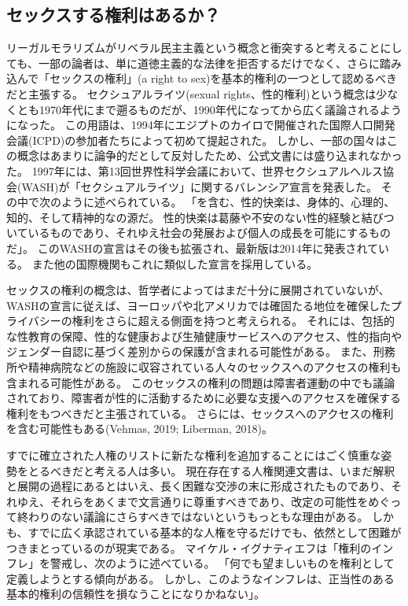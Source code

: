 \documentclass[paper=a4,book,openany]{jlreq} \usepackage{mystyle}
\begin{document}
\subsection{セックスする権利はあるか？}

リーガルモラリズムがリベラル民主主義という概念と衝突すると考えることにしても、一部の論者は、単に道徳主義的な法律を拒否するだけでなく、さらに踏み込んで「セックスの権利」(a right to sex)を基本的権利の一つとして認めるべきだと主張する。
セクシュアルライツ(sexual rights、性的権利)という概念は少なくとも1970年代にまで遡るものだが、1990年代になってから広く議論されるようになった。
この用語は、1994年にエジプトのカイロで開催された国際人口開発会議(ICPD)の参加者たちによって初めて提起された。
しかし、一部の国々はこの概念はあまりに論争的だとして反対したため、公式文書には盛り込まれなかった\citep{correa07:_global_persp_sexual_right}。
1997年には、第13回世界性科学会議において、世界セクシュアルヘルス協会(WASH)が「セクシュアルライツ」に関するバレンシア宣言を発表した。
その中で次のように述べられている。
「を含む、性的快楽は、身体的、心理的、知的、そして精神的なの源だ。
性的快楽は葛藤や不安のない性的経験と結びついているものであり、それゆえ社会の発展および個人の成長を可能にするものだ」\citep{WASH97:_valen_declar_sexual_right}。
このWASHの宣言はその後も拡張され、最新版は2014年に発表されている。
また他の国際機関もこれに類似した宣言を採用している。

セックスの権利の概念は、哲学者によってはまだ十分に展開されていないが、WASHの宣言に従えば、ヨーロッパや北アメリカでは確固たる地位を確保したプライバシーの権利をさらに超える側面を持つと考えられる。
それには、包括的な性教育の保障、性的な健康および生殖健康サービスへのアクセス、性的指向やジェンダー自認に基づく差別からの保護が含まれる可能性がある。
また、刑務所や精神病院などの施設に収容されている人々のセックスへのアクセスの権利も含まれる可能性がある。
このセックスの権利の問題は障害者運動の中でも議論されており、障害者が性的に活動するために必要な支援へのアクセスを確保する権利をもつべきだと主張されている。
さらには、セックスへのアクセスの権利を含む可能性もある(Vehmas, 2019; Liberman, 2018)。
\nocite{vehmas19:_person_profoun_intel_disab_their_right_sex}\nocite{liberman18:_disab_sex_right_scope_sexual_exclus}

すでに確立された人権のリストに新たな権利を追加することにはごく慎重な姿勢をとるべきだと考える人は多い。
現在存在する人権関連文書は、いまだ解釈と展開の過程にあるとはいえ、長く困難な交渉の末に形成されたものであり、それゆえ、それらをあくまで文言通りに尊重すべきであり、改定の可能性をめぐって終わりのない議論にさらすべきではないというもっともな理由がある。
しかも、すでに広く承認されている基本的な人権を守るだけでも、依然として困難がつきまとっているのが現実である。
マイケル・イグナティエフは「権利のインフレ」を警戒し、次のように述べている。
「何でも望ましいものを権利として定義しようとする傾向がある。
しかし、このようなインフレは、正当性のある基本的権利の信頼性を損なうことになりかねない」\citep[p.90]{ignatieff03:_human_right_polit_idolat}。
\end{document}
